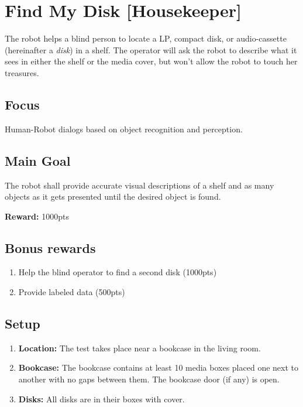 \section{Find My Disk [Housekeeper]}
The robot helps a blind person to locate a LP, compact disk, or audio-cassette (hereinafter a \textit{disk}) in a shelf. The operator will ask the robot to describe what it sees in either the shelf or the media cover, but won't allow the robot to touch her treasures.

\subsection{Focus}
Human-Robot dialogs based on object recognition and perception.

\subsection{Main Goal}
The robot shall provide accurate visual descriptions of a shelf and as many objects as it gets presented until the desired object is found.

\noindent\textbf{Reward:} 1000pts\\

\subsection{Bonus rewards}
\begin{enumerate}[nosep]
	\item Help the blind operator to find a second disk (1000pts)
	\item Provide labeled data (500pts)
\end{enumerate}

%
%
\subsection{Setup}
\begin{enumerate}
	\item \textbf{Location:} The test takes place near a bookcase in the living room.

	\item \textbf{Bookcase:} The bookcase contains at least 10 media boxes placed one next to another with no gaps between them. The bookcase door (if any) is open.

	\item \textbf{Disks:} All disks are in their boxes with cover.
\end{enumerate}


